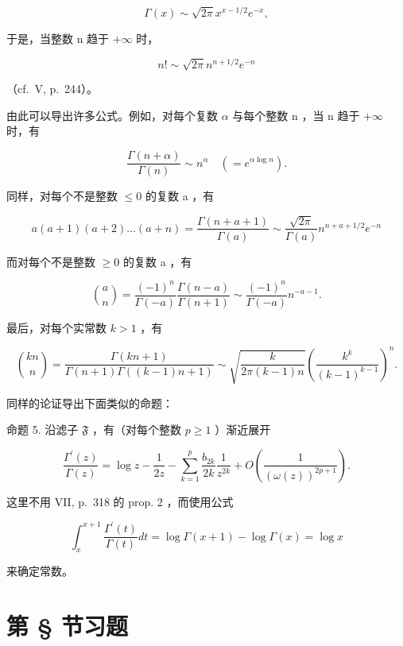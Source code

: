 \[
\Gamma (x) \sim \sqrt {2 \pi} x ^ {x - 1 / 2} e ^ {- x},\tag{21}
\]

于是，当整数 n 趋于 \(+\infty\) 时，

\[
n! \sim \sqrt {2 \pi} n ^ {n + 1 / 2} e ^ {- n}
\]

（cf.~V, p.~244）。

由此可以导出许多公式。例如，对每个复数 \(\alpha\) 与每个整数 n ，当 n 趋于 \(+\infty\) 时，有

\[
\frac {\Gamma (n + \alpha)}{\Gamma (n)} \sim n ^ {\alpha} \quad (= e ^ {\alpha \log n}).\tag{22}
\]

同样，对每个不是整数 \(\leqslant 0\) 的复数 a ，有

\[
a (a + 1) (a + 2) \dots (a + n) = \frac {\Gamma (n + a + 1)}{\Gamma (a)} \sim \frac {\sqrt {2 \pi}}{\Gamma (a)} n ^ {n + a + 1 / 2} e ^ {- n}\tag{23}
\]

而对每个不是整数 \(\geqslant 0\) 的复数 a ，有

\[
\binom {a} {n} = \frac {(- 1) ^ {n}}{\Gamma (- a)}   \frac {\Gamma (n - a)}{\Gamma (n + 1)} \sim \frac {(- 1) ^ {n}}{\Gamma (- a)}   n ^ {- a - 1}.\tag{24}
\]

最后，对每个实常数 \(k > 1\) ，有

\[
\binom {k n} {n} = \frac {\Gamma (k n + 1)}{\Gamma (n + 1)   \Gamma ((k - 1) n + 1)} \sim \sqrt {\frac {k}{2 \pi (k - 1) n}} \left(\frac {k ^ {k}}{(k - 1) ^ {k - 1}}\right) ^ {n}.\tag{25}
\]

同样的论证导出下面类似的命题：

命题 5. 沿滤子 \(\mathfrak{F}\) ，有（对每个整数 \(p \geqslant 1\) ）渐近展开

\[
\frac {\Gamma^ {\prime} (z)}{\Gamma (z)} = \log z - \frac {1}{2 z} - \sum_ {k = 1} ^ {p} \frac {b _ {2 k}}{2 k} \frac {1}{z ^ {2 k}} + O \left(\frac {1}{(\omega (z)) ^ {2 p + 1}}\right).\tag{26}
\]

这里不用 VII, p.~318 的 prop. 2 ，而使用公式

\[
\int_ {x} ^ {x + 1} \frac {\Gamma^ {\prime} (t)}{\Gamma (t)} d t = \log \Gamma (x + 1) - \log \Gamma (x) = \log x
\]

来确定常数。

\setcounter{exercisegroup}{0}
\section*{第 \S{} 节习题}
{}

